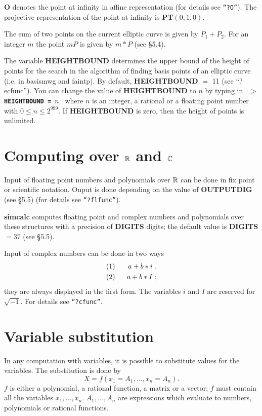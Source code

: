 {\bf O} denotes the point at infinity in affine representation (for details see 
{\tt ``?O''}). The pro\-jec\-tive representation of the point at infinity is
{\bf PT}$(0,1,0)$.

The sum of two points on the current elliptic curve is given by 
$P_1+P_2$. For an integer $m$ the point $mP$ is given by $m*P$ (see \S 5.4).

The variable {\bf HEIGHTBOUND} determines the upper bound of the
height of points for the search in the algorithm of finding
basis points of an elliptic curve (i.e. in basismwg and faintp). 
By default, {\bf HEIGHTBOUND} $=$ 11 (see ``?ecfunc''). You can 
change the value of {\bf HEIGHTBOUND} to $n$ by typing in 
\leer
{\tt
  {\bf $>$HEIGHTBOUND = $n$} \care 
}
\leer
where $n$ is an integer, a rational or a floating point number with 
$0 \leq n \leq 2^{999}$. If {\bf HEIGHTBOUND} is zero, then the height 
of points is unlimited.



\section{Computing over $\mbox{$\mathbb R$}$ and $\mbox{$\mathbb C$}$}
Input of floating point numbers and polynomials over $\mbox{$\mathbb R$}$ can be done in fix 
point or scientific notation. Ouput is done depending on the value of 
{\bf OUTPUTDIG} (see \S 5.5) (for details see {\tt ``?flfunc''}).

{\bf simcalc} computes floating point and complex numbers and polynomials 
over these structures with a precision of {\bf DIGITS} digits; the default 
value is {\bf DIGITS} $= 37$ (see \S 5.5).

Input of complex numbers can be done in two ways
\begin{eqnarray*}
 & (1)\mbox{\ \ } & a + b * i \ ,\\
 & (2)\mbox{\ \ } & a + b * I \ ;
\end{eqnarray*}
they are always displayed in the first form. The variables $i$ and $I$ are 
reserved for $\sqrt{-1}$. For details see {\tt ``?cfunc''}.


\section{Variable substitution}
In any computation with variables, it is possible to substitute values for the variables.
The substitution is done by
$$X = f(x_1 = A_1, ..., x_n = A_n).$$
$f$ is either a polynomial, a rational function, a matrix or a vector; $f$ must contain
all the variables $x_1,...,x_n$. $A_1,...,A_n$ are expressions which evaluate to numbers,
polynomials or rational functions. 


